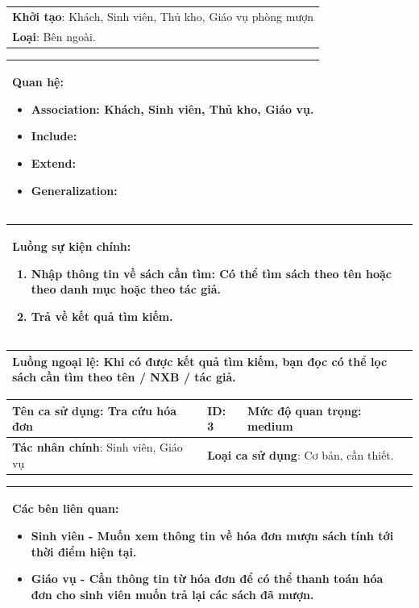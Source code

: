 \documentclass[../report.tex]{subfiles}
\begin{document}
\begin{center}
\begin{tabular}{| m{15.9cm} |}
    \hline
    \textbf{Khởi tạo}: Khách, Sinh viên, Thủ kho, Giáo vụ phòng mượn \\
    \textbf{Loại}: Bên ngoài.  \\
    \hline
\end{tabular}

\begin{tabular}{| m{15.9cm} |}
    \hline
    \textbf{Quan hệ}:
    \begin{itemize}
        \item Association: Khách, Sinh viên, Thủ kho, Giáo vụ. 
        \item Include: 
        \item Extend: 
        \item Generalization: 
    \end{itemize} \\
    \hline
\end{tabular}

\begin{tabular}{| m{15.9cm} |}
    \hline
    \textbf{Luồng sự kiện chính}:
    \begin{enumerate}
        \item Nhập thông tin về sách cần tìm: Có thể tìm sách theo tên hoặc theo danh mục hoặc theo tác giả. 
        \item Trả về kết quả tìm kiếm. 
    \end{enumerate} \\
    \hline
\end{tabular}

\begin{tabular}{| m{15.9cm} |}
    \hline
    \textbf{Luồng ngoại lệ}: Khi có được kết quả tìm kiếm, bạn đọc có thể lọc sách cần tìm theo tên / NXB / tác giả. \\
    \hline
\end{tabular}

\newpage
\begin{tabular}{| m{6cm} | m{3cm} | m{6cm} |}
    \hline
    \textbf{Tên ca sử dụng}: Tra cứu hóa đơn & \textbf{ID}: 3 & \textbf{Mức độ quan trọng}: medium \\
    \hline
    \textbf{Tác nhân chính}: Sinh viên, Giáo vụ & \multicolumn{2}{|l|}{\textbf{Loại ca sử dụng}: Cơ bản, cần thiết.} \\
    \hline
\end{tabular}
\begin{tabular}{| m{15.9cm} |}
    \hline
        \textbf{Các bên liên quan:} 
        \begin{itemize}
            \item Sinh viên - Muốn xem thông tin về hóa đơn mượn sách tính tới thời điểm hiện tại. 
            \item Giáo vụ - Cần thông tin từ hóa đơn để có thể thanh toán hóa đơn cho sinh viên muốn trả lại các sách đã mượn. 
        \end{itemize} \\
    \hline
\end{tabular}


\end{center}
\end{document}
